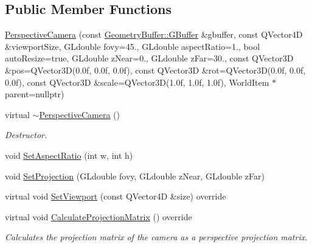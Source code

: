 \subsection*{Public Member Functions}
\begin{DoxyCompactItemize}
\item 
\mbox{\hyperlink{class_geometry_engine_1_1_geometry_world_item_1_1_geometry_camera_1_1_perspective_camera_af0a4e92f824fe48d8b597507bfc9b453}{Perspective\+Camera}} (const \mbox{\hyperlink{class_geometry_engine_1_1_geometry_buffer_1_1_g_buffer}{Geometry\+Buffer\+::\+G\+Buffer}} \&gbuffer, const Q\+Vector4D \&viewport\+Size, G\+Ldouble fovy=45., G\+Ldouble aspect\+Ratio=1., bool auto\+Resize=true, G\+Ldouble z\+Near=0., G\+Ldouble z\+Far=30., const Q\+Vector3D \&pos=Q\+Vector3D(0.\+0f, 0.\+0f, 0.\+0f), const Q\+Vector3\+D \&rot=\+Q\+Vector3\+D(0.\+0f, 0.\+0f, 0.\+0f), const Q\+Vector3\+D \&scale=\+Q\+Vector3\+D(1.\+0f, 1.\+0f, 1.\+0f), World\+Item $\ast$parent=nullptr)
\item 
\mbox{\label{class_geometry_engine_1_1_geometry_world_item_1_1_geometry_camera_1_1_perspective_camera_a574f8b77fbd6cb709d5f75f2db50d4cc}} 
virtual \mbox{\hyperlink{class_geometry_engine_1_1_geometry_world_item_1_1_geometry_camera_1_1_perspective_camera_a574f8b77fbd6cb709d5f75f2db50d4cc}{$\sim$\+Perspective\+Camera}} ()
\begin{DoxyCompactList}\small\item\em Destructor. \end{DoxyCompactList}\item 
void \mbox{\hyperlink{class_geometry_engine_1_1_geometry_world_item_1_1_geometry_camera_1_1_perspective_camera_aae0b0f9a3cb2d11e946365129e75eb04}{Set\+Aspect\+Ratio}} (int w, int h)
\item 
void \mbox{\hyperlink{class_geometry_engine_1_1_geometry_world_item_1_1_geometry_camera_1_1_perspective_camera_a375484bac9392be5744ba9abda03a6a9}{Set\+Projection}} (G\+Ldouble fovy, G\+Ldouble z\+Near, G\+Ldouble z\+Far)
\item 
virtual void \mbox{\hyperlink{class_geometry_engine_1_1_geometry_world_item_1_1_geometry_camera_1_1_perspective_camera_a6b405005376c1396b311ebd16dcc4e98}{Set\+Viewport}} (const Q\+Vector4D \&size) override
\item 
\mbox{\label{class_geometry_engine_1_1_geometry_world_item_1_1_geometry_camera_1_1_perspective_camera_aab54d51e17bcf21ec1144f8f60f83686}} 
virtual void \mbox{\hyperlink{class_geometry_engine_1_1_geometry_world_item_1_1_geometry_camera_1_1_perspective_camera_aab54d51e17bcf21ec1144f8f60f83686}{Calculate\+Projection\+Matrix}} () override
\begin{DoxyCompactList}\small\item\em Calculates the projection matrix of the camera as a perspective projection matrix. \end{DoxyCompactList}\end{DoxyCompactItemize}
